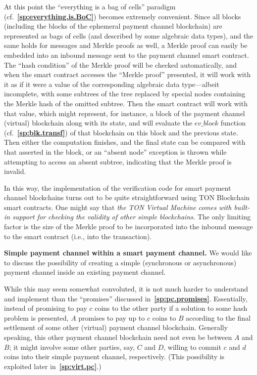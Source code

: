 \documentclass[12pt,oneside]{article}
\def\makepoint#1{\medbreak\noindent{\bf #1.\ }}
\def\nxsubpoint{\refstepcounter{subsubsection}%
  \smallbreak\makepoint{\thesubsubsection}}
\def\refpoint#1{{\rm\textbf{\ref{#1}}}}
\let\ptref=\refpoint
\def\embt(#1.){\textbf{#1.}}
\let\vr=\textit
\def\evblock{\vr{ev\_block}}
\begin{document}
At this point the ``everything is a bag of cells'' paradigm
(cf.~\ptref{sp:everything.is.BoC}) becomes extremely convenient. Since
all blocks (including the blocks of the ephemeral payment channel
blockchain) are represented as bags of cells (and described by some
algebraic data types), and the same holds for messages and Merkle
proofs as well, a Merkle proof can easily be embedded into an inbound
message sent to the payment channel smart contract. The ``hash
condition'' of the Merkle proof will be checked automatically, and
when the smart contract accesses the ``Merkle proof'' presented, it
will work with it as if it were a value of the corresponding algebraic
data type---albeit incomplete, with some subtrees of the tree replaced
by special nodes containing the Merkle hash of the omitted
subtree. Then the smart contract will work with that value, which
might represent, for instance, a block of the payment channel
(virtual) blockchain along with its state, and will evaluate the
$\evblock$ function (cf.~\ptref{sp:blk.transf}) of that blockchain on
this block and the previous state. Then either the computation
finishes, and the final state can be compared with that asserted in
the block, or an ``absent node'' exception is thrown while attempting
to access an absent subtree, indicating that the Merkle proof is
invalid.

In this way, the implementation of the verification code for smart
payment channel blockchains turns out to be quite straightforward
using TON Blockchain smart contracts. One might say that {\em the TON
  Virtual Machine comes with built-in support for checking the
  validity of other simple blockchains.} The only limiting factor is
the size of the Merkle proof to be incorporated into the inbound
message to the smart contract (i.e., into the transaction).

\nxsubpoint\label{sp:pc.within.pc} \embt(Simple payment channel within
a smart payment channel.)  We would like to discuss the possibility of
creating a simple (synchronous or asynchronous) payment channel inside
an existing payment channel.

While this may seem somewhat convoluted, it is not much harder to
understand and implement than the ``promises'' discussed
in~\ptref{sp:pc.promises}. Essentially, instead of promising to pay
$c$ coins to the other party if a solution to some hash problem is
presented, $A$ promises to pay up to $c$ coins to $B$ according to the
final settlement of some other (virtual) payment channel
blockchain. Generally speaking, this other payment channel blockchain
need not even be between $A$ and $B$; it might involve some other
parties, say, $C$ and $D$, willing to commit $c$ and $d$ coins into
their simple payment channel, respectively. (This possibility is
exploited later in~\ptref{sp:virt.pc}.)
\end{document}
